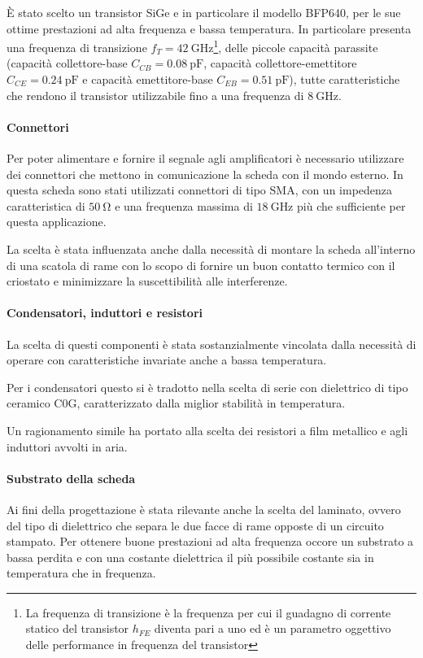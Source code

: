 \documentclass[12pt,oneside]{book}
\begin{document}
È stato scelto un transistor SiGe e in particolare il modello BFP640, per le sue ottime prestazioni ad alta frequenza e bassa temperatura. In particolare presenta una frequenza di transizione $f_T=\SI{42}{\giga\hertz}$\footnote{La frequenza di transizione è la frequenza per cui il guadagno di corrente statico del transistor $h_{FE}$ diventa pari a uno ed è un parametro oggettivo delle performance in frequenza del transistor}, delle piccole capacità parassite (capacità collettore-base $C_{CB}=\SI{0.08}{\pico\farad}$, capacità collettore-emettitore $C_{CE}=\SI{0.24}{\pico\farad}$ e capacità emettitore-base $C_{EB}=\SI{0.51}{\pico\farad}$), tutte caratteristiche che rendono il transistor utilizzabile fino a una frequenza di $\SI{8}{\giga\hertz}$.



\paragraph{Connettori} Per poter alimentare e fornire il segnale agli amplificatori è necessario utilizzare dei connettori che mettono in comunicazione la scheda con il mondo esterno. In questa scheda sono stati utilizzati connettori di tipo SMA, con un impedenza caratteristica di $\SI{50}{\ohm}$ e una frequenza massima di $\SI{18}{\giga\hertz}$ più che sufficiente per questa applicazione.

La scelta è stata influenzata anche dalla necessità di montare la scheda all'interno di una scatola di rame con lo scopo di fornire un buon contatto termico con il criostato e minimizzare la suscettibilità alle interferenze.

\paragraph{Condensatori, induttori e resistori} La scelta di questi componenti è stata sostanzialmente vincolata dalla necessità di operare con caratteristiche invariate anche a bassa temperatura.

Per i condensatori questo si è tradotto nella scelta di serie con dielettrico di  tipo ceramico C0G, caratterizzato dalla miglior stabilità in temperatura.

Un ragionamento simile ha portato alla scelta dei resistori a film metallico e agli induttori avvolti in aria.

\paragraph{Substrato della scheda} Ai fini della progettazione è stata rilevante anche la scelta del laminato, ovvero del tipo di dielettrico che separa le due facce di rame opposte di un circuito stampato. Per ottenere buone prestazioni ad alta frequenza occore un substrato a bassa perdita e con una costante dielettrica il più possibile costante sia in temperatura che in frequenza.
\end{document}

